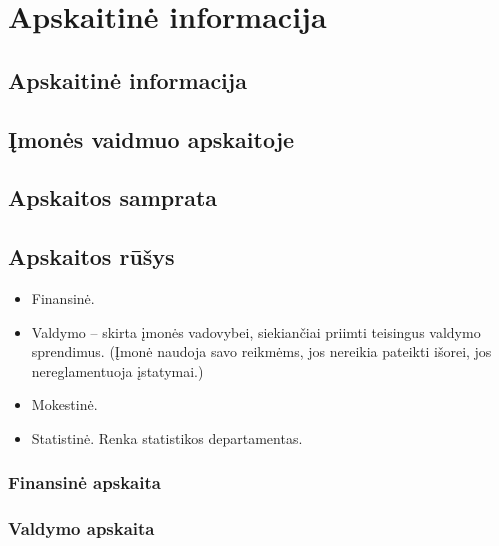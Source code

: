\chapter{Apskaitinė informacija}


\section{Apskaitinė informacija}


\section{Įmonės vaidmuo apskaitoje}


\section{Apskaitos samprata}


\section{Apskaitos rūšys}


\begin{itemize}
  \item Finansinė.
  \item Valdymo – skirta įmonės vadovybei, siekiančiai priimti teisingus
    valdymo sprendimus. (Įmonė naudoja savo reikmėms, jos nereikia
    pateikti išorei, jos nereglamentuoja įstatymai.)
  \item Mokestinė.
  \item Statistinė. Renka statistikos departamentas.
\end{itemize}

\subsection{Finansinė apskaita}


\subsection{Valdymo apskaita}


